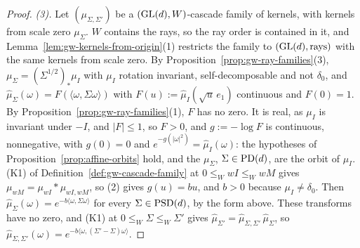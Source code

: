 \begin{proof}
\emph{(3).} Let $(\mu_{\Sigma,\Sigma'})$ be a $(\mathrm{GL}(d), W)$-cascade family of kernels, with kernels from scale zero $\mu_\Sigma$. $W$ contains the rays, so the ray order is contained in it, and
Lemma~\ref{lem:gw-kernels-from-origin}(1) restricts the family to $(\mathrm{GL}(d), \text{rays})$ with the same kernels
from scale zero. By Proposition~\ref{prop:gw-ray-families}(3), $\mu_\Sigma = (\Sigma^{1/2})_*\mu_I$ with $\mu_I$
rotation invariant, self-decomposable and not $\delta_0$, and $\widehat\mu_\Sigma(\omega) =
F(\langle\omega,\Sigma\omega\rangle)$ with $F(u) := \widehat\mu_I(\sqrt u\,e_1)$ continuous and $F(0) = 1$. By
Proposition~\ref{prop:gw-ray-families}(1), $F$ has no zero. It is real, as $\mu_I$ is invariant under $-I$, and
$|F| \le 1$, so $F > 0$, and $g := -\log F$ is continuous, nonnegative, with $g(0) = 0$ and
$e^{-g(|\omega|^2)} = \widehat\mu_I(\omega)$: the hypotheses of Proposition~\ref{prop:affine-orbits} hold, and the
$\mu_\Sigma$, $\Sigma \in \mathrm{PD}(d)$, are the orbit of $\mu_I$. (K1) of Definition~\ref{def:gw-cascade-family} at $0 \le_W wI \le_W wM$ gives
$\mu_{wM} = \mu_{wI} * \mu_{wI,wM}$, so (2) gives $g(u) = bu$, and $b > 0$ because $\mu_I \ne \delta_0$.
Then $\widehat\mu_\Sigma(\omega) = e^{-b\langle\omega,\Sigma\omega\rangle}$ for every $\Sigma \in \mathrm{PSD}(d)$, by
the form above. These transforms have no zero, and (K1) at $0 \le_W \Sigma \le_W \Sigma'$ gives
$\widehat\mu_{\Sigma'} = \widehat\mu_{\Sigma,\Sigma'}\,\widehat\mu_\Sigma$, so
$\widehat\mu_{\Sigma,\Sigma'}(\omega) = e^{-b\langle\omega,(\Sigma'-\Sigma)\omega\rangle}$.
\end{proof}

